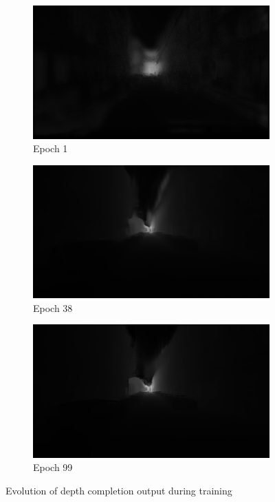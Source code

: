\begin{figure}[h]
    \centering
    \begin{subfigure}{\textwidth}
        \centering
        \includegraphics[width=\textwidth, trim=0 200pt 0 200pt, clip]{figures/step1.png}
        \caption{Epoch 1}
        \label{fig:epoch1}
    \end{subfigure}
    \hfill
    \begin{subfigure}{\textwidth}
        \centering
        \includegraphics[width=\textwidth, trim=0 200pt 0 200pt, clip]{figures/step38.png}
        \caption{Epoch 38}
        \label{fig:epoch38}
    \end{subfigure}
    \hfill
    \begin{subfigure}{\textwidth}
        \centering
        \includegraphics[width=\textwidth, trim=0 200pt 0 200pt, clip]{figures/step99.png}
        \caption{Epoch 99}
        \label{fig:epoch99}
    \end{subfigure}
    \caption{Evolution of depth completion output during training}
    \label{fig:training_progress}
\end{figure}

